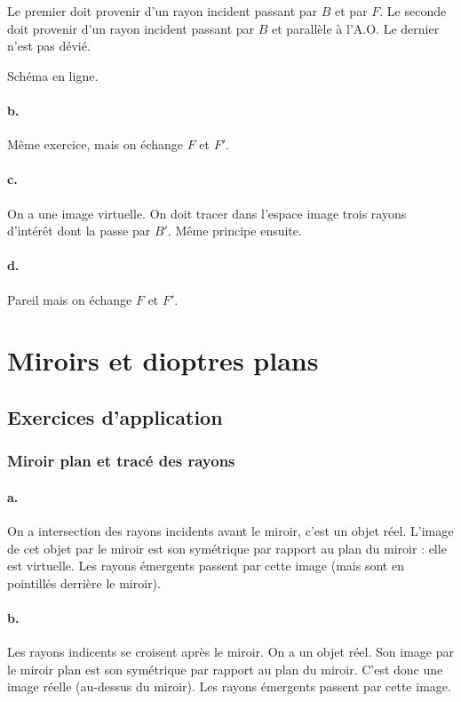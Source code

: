 \documentclass[10pt,a5paper,notitlepage]{book}
\begin{document}
Le premier doit provenir d'un rayon incident passant par $B$ et par $F$. Le
seconde doit provenir d'un rayon incident passant par $B$ et parallèle à l'A.O.
Le dernier n'est pas dévié. \bigbreak

Schéma en ligne.

\subsubsection{b.}
Même exercice, mais on échange $F$ et $F'$.

\subsubsection{c.}
On a une image virtuelle. On doit tracer dans l'espace image trois rayons
d'intérêt dont la  passe par $B'$. Même principe ensuite.

\subsubsection{d.}
Pareil mais on échange $F$ et $F'$.

\theendnotes

\chapter{Miroirs et dioptres plans}
\vspace*{-24pt}
\section{Exercices d'application}
\subsection{Miroir plan et tracé des rayons}
\subsubsection{a.}
On a intersection des rayons incidents avant le miroir, c'est un objet réel.
L'image de cet objet par le miroir est son symétrique par rapport au plan du
miroir : elle est virtuelle. Les rayons émergents passent par cette image (mais
sont en pointillés derrière le miroir).

\subsubsection{b.}
Les rayons indicents se croisent après le miroir. On a un objet réel. Son image
par le miroir plan est son symétrique par rapport au plan du miroir. C'est donc
une image réelle (au-dessus du miroir). Les rayons émergents passent par cette
image.
\end{document}
